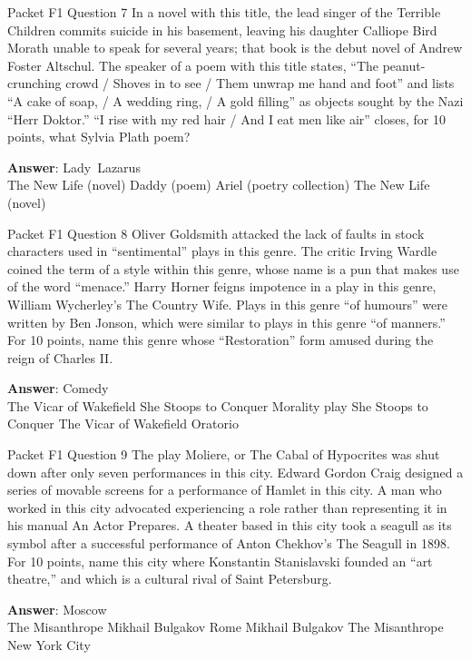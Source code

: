 \begin{frame}{Packet F1 Question 7}
In a novel with this title, the lead singer of the Terrible Children commits suicide in his basement, leaving his daughter Calliope Bird Morath unable to speak for several years; that book is the debut novel of Andrew Foster Altschul. The speaker of a poem with this title states, “The peanut-crunching   crowd / Shoves in to see / Them unwrap me hand and foot” and lists “A cake of soap, / A wedding ring, / A gold filling” as objects sought by the Nazi “Herr Doktor.”   “I rise with my red hair / And I eat men like air” closes, for 10 points, what Sylvia Plath poem?      

\textbf{Answer}: Lady\ Lazarus\\
 The New Life (novel)
 Daddy (poem)
 Ariel (poetry collection)
 The New Life (novel)
\end{frame}

\begin{frame}{Packet F1 Question 8}
Oliver Goldsmith attacked   the lack of faults in stock characters used in “sentimental” plays in this genre.   The critic Irving Wardle coined the term of a style within this genre, whose name is a pun that makes use of the word “menace.” Harry Horner feigns impotence in a play in this genre, William Wycherley’s The Country Wife. Plays in this genre “of humours” were written by Ben Jonson, which were similar to plays in this genre “of manners.” For 10 points, name this genre whose “Restoration” form amused during the reign of Charles II.        

\textbf{Answer}: Comedy\\
 The Vicar of Wakefield
 She Stoops to Conquer
 Morality play
 She Stoops to Conquer
 The Vicar of Wakefield
 Oratorio
\end{frame}

\begin{frame}{Packet F1 Question 9}
The play Moliere, or The   Cabal of Hypocrites was shut down after   only seven performances in this city. Edward Gordon Craig designed a series of movable screens for a performance of Hamlet in this city. A man who worked in this city advocated experiencing a role rather than representing it in his manual An Actor Prepares. A theater based in this city took a seagull as its symbol after a successful performance of Anton Chekhov’s The Seagull in 1898. For 10 points, name this city where Konstantin Stanislavski founded an “art theatre,” and which is a cultural rival of Saint Petersburg.        

\textbf{Answer}: Moscow\\
 The Misanthrope
 Mikhail Bulgakov
 Rome
 Mikhail Bulgakov
 The Misanthrope
 New York City
\end{frame}

